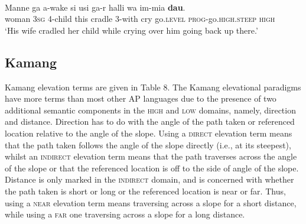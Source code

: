 \ea%
\label{ex:7:37}
 \\
\gll Manne   ga{\ng}  a-wake  si{\ng}  usi{\ng}  ga-r  halli  wa  im-mia  \textbf{dau}. \\
   woman  \textsc{3sg} 4-child  this    cradle  3-with  cry  go.\textsc{level}   \textsc{prog}{}-go.\textsc{high.steep} \textsc {high   } \\
\glt  `His wife cradled her child while crying over him going back up there.'
\z


 

\subsection{Kamang}
Kamang elevation terms are given in Table 8. The Kamang elevational paradigms have more terms than most other AP languages due to the presence of two additional semantic components in the \textsc{high} and \textsc{low} domains, namely, direction and distance. Direction has to do with the angle of the path taken or referenced location relative to the angle of the slope. Using a \textsc{direct} elevation term means that the path taken follows the angle of the slope directly (i.e., at its steepest), whilst an \textsc{indirect} elevation term means that the path traverses across the angle of the slope or that the referenced location is off to the side of angle of the slope. Distance is only marked in the \textsc{indirect} domain, and is concerned with whether the path taken is short or long or the referenced location is near or far. Thus, using a \textsc{near} elevation term means traversing across a slope for a short distance, while using a \textsc{far} one traversing across a slope for a long distance.

 

